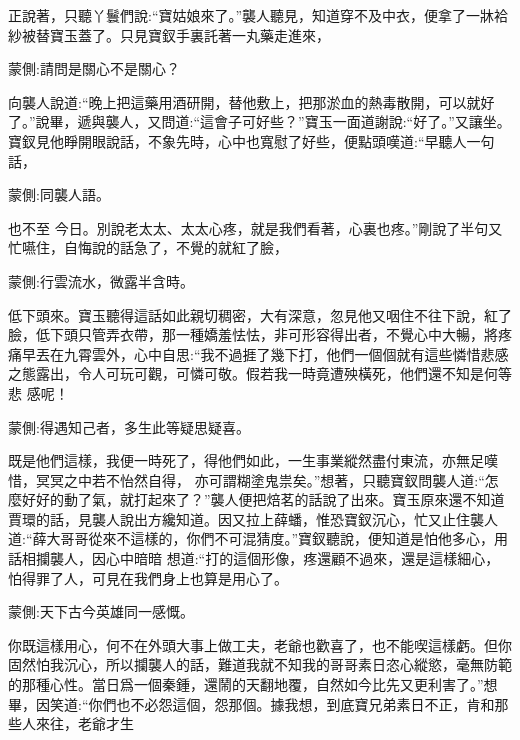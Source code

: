 \begin{parag}
    正說著，只聽丫鬟們說:“寶姑娘來了。”襲人聽見，知道穿不及中衣，便拿了一牀袷紗被替寶玉蓋了。只見寶釵手裏託著一丸藥走進來，\begin{note}蒙側:請問是關心不是關心？\end{note}向襲人說道:“晚上把這藥用酒研開，替他敷上，把那淤血的熱毒散開，可以就好了。”說畢，遞與襲人，又問道:“這會子可好些？”寶玉一面道謝說:“好了。”又讓坐。寶釵見他睜開眼說話，不象先時，心中也寬慰了好些，便點頭嘆道:“早聽人一句話，\begin{note}蒙側:同襲人語。\end{note}也不至 今日。別說老太太、太太心疼，就是我們看著，心裏也疼。”剛說了半句又忙嚥住，自悔說的話急了，不覺的就紅了臉，\begin{note}蒙側:行雲流水，微露半含時。\end{note}低下頭來。寶玉聽得這話如此親切稠密，大有深意，忽見他又咽住不往下說，紅了臉，低下頭只管弄衣帶，那一種嬌羞怯怯，非可形容得出者，不覺心中大暢，將疼痛早丟在九霄雲外，心中自思:“我不過捱了幾下打，他們一個個就有這些憐惜悲感之態露出，令人可玩可觀，可憐可敬。假若我一時竟遭殃橫死，他們還不知是何等悲 感呢！\begin{note}蒙側:得遇知己者，多生此等疑思疑喜。\end{note}既是他們這樣，我便一時死了，得他們如此，一生事業縱然盡付東流，亦無足嘆惜，冥冥之中若不怡然自得， 亦可謂糊塗鬼祟矣。”想著，只聽寶釵問襲人道:“怎麼好好的動了氣，就打起來了？”襲人便把焙茗的話說了出來。寶玉原來還不知道賈環的話，見襲人說出方纔知道。因又拉上薛蟠，惟恐寶釵沉心，忙又止住襲人道:“薛大哥哥從來不這樣的，你們不可混猜度。”寶釵聽說，便知道是怕他多心，用話相攔襲人，因心中暗暗 想道:“打的這個形像，疼還顧不過來，還是這樣細心，怕得罪了人，可見在我們身上也算是用心了。\begin{note}蒙側:天下古今英雄同一感慨。\end{note}你既這樣用心，何不在外頭大事上做工夫，老爺也歡喜了，也不能喫這樣虧。但你固然怕我沉心，所以攔襲人的話，難道我就不知我的哥哥素日恣心縱慾，毫無防範的那種心性。當日爲一個秦鍾，還鬧的天翻地覆，自然如今比先又更利害了。”想畢，因笑道:“你們也不必怨這個，怨那個。據我想，到底寶兄弟素日不正，肯和那些人來往，老爺才生 
\end{parag}
